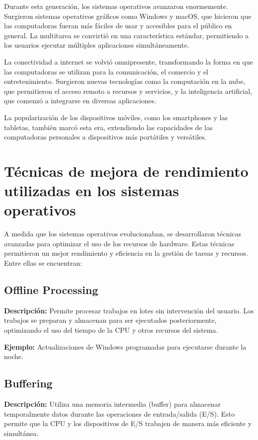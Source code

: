 Durante esta generación, los sistemas operativos avanzaron enormemente. Surgieron sistemas operativos gráficos como Windows y macOS, que hicieron que las computadoras fueran más fáciles de usar y accesibles para el público en general. La multitarea se convirtió en una característica estándar, permitiendo a los usuarios ejecutar múltiples aplicaciones simultáneamente.

La conectividad a internet se volvió omnipresente, transformando la forma en que las computadoras se utilizan para la comunicación, el comercio y el entretenimiento. Surgieron nuevas tecnologías como la computación en la nube, que permitieron el acceso remoto a recursos y servicios, y la inteligencia artificial, que comenzó a integrarse en diversas aplicaciones.

La popularización de los dispositivos móviles, como los smartphones y las tabletas, también marcó esta era, extendiendo las capacidades de las computadoras personales a dispositivos más portátiles y versátiles.




\section{Técnicas de mejora de rendimiento utilizadas en los sistemas operativos}
A medida que los sistemas operativos evolucionaban, se desarrollaron técnicas avanzadas para optimizar el uso de los recursos de hardware. Estas técnicas permitieron un mejor rendimiento y eficiencia en la gestión de tareas y recursos. Entre ellas se encuentran:

\subsection{Offline Processing}

\textbf{Descripción:} Permite procesar trabajos en lotes sin intervención del usuario. Los trabajos se preparan y almacenan para ser ejecutados posteriormente, optimizando el uso del tiempo de la CPU y otros recursos del sistema.

\textbf{Ejemplo:} Actualizaciones de Windows programadas para ejecutarse durante la noche.

\subsection{Buffering}
\textbf{Descripción:} Utiliza una memoria intermedia (buffer) para almacenar temporalmente datos durante las operaciones de entrada/salida (E/S). Esto permite que la CPU y los dispositivos de E/S trabajen de manera más eficiente y simultánea.

